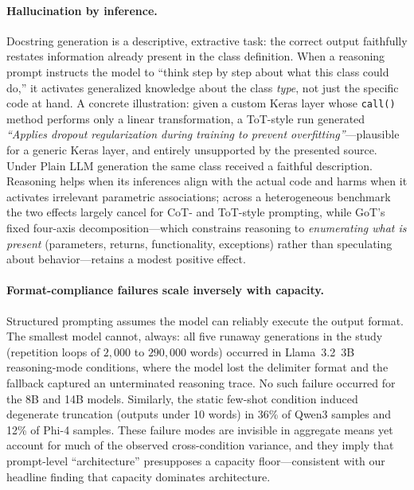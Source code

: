\documentclass[pdflatex,sn-mathphys-ay]{sn-jnl}%
\theoremstyle{thmstyleone}%
\theoremstyle{thmstyletwo}%
\theoremstyle{thmstylethree}%
\begin{document}
\paragraph{Hallucination by inference.}
Docstring generation is a descriptive, extractive task: the correct output faithfully restates information already present in the class definition. When a reasoning prompt instructs the model to ``think step by step about what this class could do,'' it activates generalized knowledge about the class \emph{type}, not just the specific code at hand. A concrete illustration: given a custom Keras layer whose \texttt{call()} method performs only a linear transformation, a ToT-style run generated \emph{``Applies dropout regularization during training to prevent overfitting''}---plausible for a generic Keras layer, and entirely unsupported by the presented source. Under Plain LLM generation the same class received a faithful description. Reasoning helps when its inferences align with the actual code and harms when it activates irrelevant parametric associations; across a heterogeneous benchmark the two effects largely cancel for CoT- and ToT-style prompting, while GoT's fixed four-axis decomposition---which constrains reasoning to \emph{enumerating what is present} (parameters, returns, functionality, exceptions) rather than speculating about behavior---retains a modest positive effect.

\paragraph{Format-compliance failures scale inversely with capacity.}
Structured prompting assumes the model can reliably execute the output format. The smallest model cannot, always: all five runaway generations in the study (repetition loops of $2{,}000$ to $290{,}000$ words) occurred in Llama~3.2~3B reasoning-mode conditions, where the model lost the delimiter format and the fallback captured an unterminated reasoning trace. No such failure occurred for the 8B and 14B models. Similarly, the static few-shot condition induced degenerate truncation (outputs under 10 words) in 36\% of Qwen3 samples and 12\% of Phi-4 samples. These failure modes are invisible in aggregate means yet account for much of the observed cross-condition variance, and they imply that prompt-level ``architecture'' presupposes a capacity floor---consistent with our headline finding that capacity dominates architecture.
\end{document}
